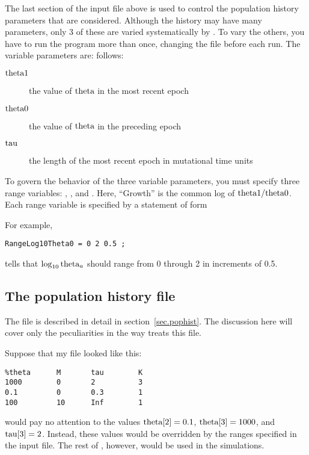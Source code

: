 The last section of the input file above is used to control the
population history parameters that are considered.  Although the
history may have many parameters, only 3 of these are varied
systematically by .  To vary the others, you have to run the
program more than once, changing the  file before each
run.  The variable parameters are:
follows:
\begin{description}
\item[$\hbox{theta1}$] the value of $\hbox{theta}$ in the most recent epoch\\
\item[$\hbox{theta0}$] the value of $\hbox{theta}$ in the preceding epoch\\
\item[$\hbox{tau}$] the length of the most recent epoch in mutational time
units
\end{description}

To govern the behavior of the three variable parameters, you must
specify three range variables: ,
, and .  Here, ``Growth'' is the common
log of $\hbox{theta1}/\hbox{theta0}$.  Each range variable is specified by a
statement of form
\begin{center}
\end{center}
For example,
\begin{verbatim}
RangeLog10Theta0 = 0 2 0.5 ;
\end{verbatim}
tells  that $\log_{10} \hbox{theta}_a$ should range from 0 through
2 in increments of 0.5.  

\subsection{The population history file}

The  file is described in detail in
section~\ref{sec.pophist}.  The discussion here will cover only the
peculiarities in the way  treats this file.

Suppose that my  file looked like this:
\begin{verbatim}
%theta      M       tau        K
1000        0       2          3
0.1         0       0.3        1
100         10      Inf        1
\end{verbatim}
 would pay no attention to the values
$\hbox{theta}[2] = 0.1$, $\hbox{theta}[3] = 1000$, and $\hbox{tau}[3]=2$.  Instead,
these values would be overridden by the ranges specified in the input
file.   The rest of , however, would be used in the
simulations. 

